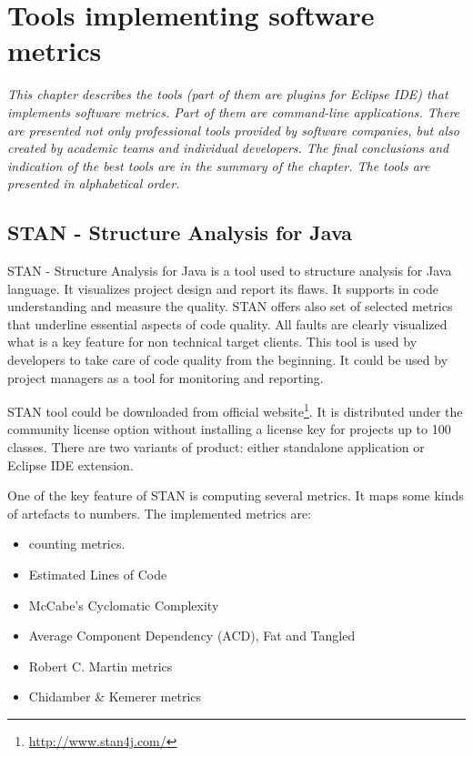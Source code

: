 \chapter{Tools implementing software metrics} \label{roz:metrics-tools}

\textit{This chapter describes the tools (part of them are plugins for Eclipse IDE) that implements software metrics. Part of them are command-line applications. There are presented not only professional tools provided by software companies, but also created by academic teams and individual developers. The final conclusions and indication of the best tools are in the summary of the chapter. The tools are presented in alphabetical order.} 

\section{STAN - Structure Analysis for Java} 
STAN - Structure Analysis for Java is a tool used to structure analysis for Java language. It visualizes project design and report its flaws. It supports in code understanding and measure the quality. STAN offers also set of selected metrics that underline essential aspects of code quality. All faults are clearly visualized what is a key feature for non technical target clients. This tool is used by developers to take care of code quality from the beginning. It could be used by project managers as a tool for monitoring and reporting. 

STAN tool could be downloaded from official website\footnote{\url{http://www.stan4j.com/}}. It is distributed under the community license option without installing a license key for projects up to 100 classes. There are two variants of product: either standalone application or Eclipse IDE extension.

One of the key feature of STAN is computing several metrics. It maps some kinds of artefacts to numbers. The implemented metrics are:

\begin{itemize}
\item counting metrics.
\item Estimated Lines of Code
\item McCabe's Cyclomatic Complexity
\item Average Component Dependency (ACD), Fat and Tangled
\item Robert C. Martin metrics
\item Chidamber \& Kemerer metrics
\end{itemize}

